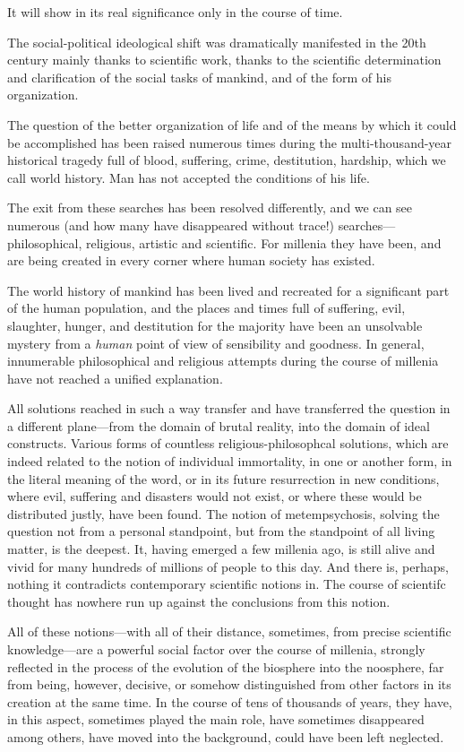 It will show in its real significance only in the course of time.

The social-political ideological shift was dramatically manifested in the 20th
century mainly thanks to scientific work, thanks to the scientific
determination and clarification of the social tasks of mankind, and of the
form of his organization.


\Section %
The question of the better organization of life and of the means by which
it could be accomplished has been raised numerous times during the
multi-thousand-year historical tragedy full of blood, suffering, crime,
destitution, hardship, which we call world history.  Man has not accepted the
conditions of his life.

The exit from these searches has been resolved differently, and we can see
numerous (and how many have disappeared without trace!)
searches---philosophical, religious, artistic and scientific.  For millenia
they have been, and are being created in every corner where human society has
existed.

The world history of mankind has been lived and recreated for a significant
part of the human population, and the places and times full of suffering,
evil, slaughter, hunger, and destitution for the majority have been an
unsolvable mystery from a \emph{human} point of view of sensibility and
goodness.  In general, innumerable philosophical and religious attempts during
the course of millenia have not reached a unified explanation.

All solutions reached in such a way transfer and have transferred the question
in a different plane---from the domain of brutal reality, into the domain of
ideal constructs. Various forms of countless religious-philosophcal solutions,
which are indeed related to the notion of individual immortality, in one or
another form, in the literal meaning of the word, or in its future resurrection
in new conditions, where evil, suffering and disasters would not exist, or
where these would be distributed justly, have been found.  The notion of
metempsychosis, solving the question not from a personal standpoint, but from
the standpoint of all living matter, is the deepest.  It, having emerged a few
millenia ago, is still alive and vivid for many hundreds of millions of people
to this day.  And there is, perhaps, nothing it contradicts contemporary
scientific notions in.  The course of scientifc thought has nowhere run up
against the conclusions from this notion.

All of these notions---with all of their distance, sometimes, from precise
scientific knowledge---are a powerful social factor over the course of
millenia, strongly reflected in the process of the evolution of the biosphere
into the noosphere, far from being, however, decisive, or somehow distinguished
from other factors in its creation at the same time.  In the course of tens of
thousands of years, they have, in this aspect, sometimes played the main role,
have sometimes disappeared among others, have moved into the background, could
have been left neglected.


